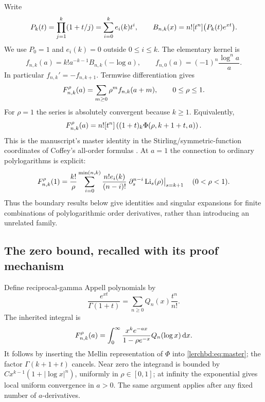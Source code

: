 Write
\begin{equation}\label{lerchbd:eq:Pk}
 P_k(t)=\prod_{j=1}^k(1+t/j)=\sum_{i=0}^k e_i(k)t^i,
 \qquad
 B_{n,k}(x)=n![t^{n}]\bigl(P_k(t)e^{xt}\bigr).
\end{equation}
We use $P_0=1$ and $e_i(k)=0$ outside $0\le i\le k$. The elementary kernel is
\begin{equation}\label{lerchbd:eq:f}
 f_{n,k}(a)=k!a^{-k-1}B_{n,k}(-\log a),
 \qquad
 f_{n,0}(a)=(-1)^n\frac{\log^n a}{a}.
\end{equation}
In particular $f_{n,k}'=-f_{n,k+1}$. Termwise differentiation gives
\begin{equation}\label{lerchbd:eq:spectral}
 F_{n,k}^{\rho}(a)=\sum_{m\ge0}\rho^m f_{n,k}(a+m),
 \qquad 0\le\rho\le1.
\end{equation}
For $\rho=1$ the series is absolutely convergent because $k\ge1$. Equivalently,
\begin{equation}\label{lerchbd:eq:master}
 F_{n,k}^{\rho}(a)=n![t^{n}]\left((1+t)_k\Phi(\rho,k+1+t,a)\right).
\end{equation}
This is the manuscript's master identity in the Stirling/symmetric-function coordinates of Coffey's all-order formulas \cite{lerchbd:coffey,lerchbd:repo}. At $a=1$ the connection to ordinary polylogarithms is explicit:
\begin{equation}\label{lerchbd:eq:polylog}
 F_{n,k}^{\rho}(1)=\frac{k!}{\rho}
 \sum_{i=0}^{\min(n,k)}\frac{n!e_i(k)}{(n-i)!}
 \left.\partial_s^{n-i}\operatorname{Li}_s(\rho)\right|_{s=k+1}
 \quad(0<\rho<1).
\end{equation}
Thus the boundary results below give identities and singular expansions for finite combinations of polylogarithmic order derivatives, rather than introducing an unrelated family.

\subsection{The zero bound, recalled with its proof mechanism}
Define reciprocal-gamma Appell polynomials by
\[
 \frac{e^{xt}}{\Gamma(1+t)}=\sum_{n\ge0}Q_n(x)\frac{t^n}{n!}.
\]
The inherited integral is
\begin{equation}\label{lerchbd:eq:laplace}
 F_{n,k}^{\rho}(a)=\int_0^\infty
 \frac{x^ke^{-ax}}{1-\rho e^{-x}}Q_n(\log x)\,\mathrm d x.
\end{equation}
It follows by inserting the Mellin representation of $\Phi$ into \eqref{lerchbd:eq:master}; the factor $\Gamma(k+1+t)$ cancels. Near zero the integrand is bounded by $C x^{k-1}(1+|\log x|^n)$, uniformly in $\rho\in[0,1]$; at infinity the exponential gives local uniform convergence in $a>0$. The same argument applies after any fixed number of $a$-derivatives.

